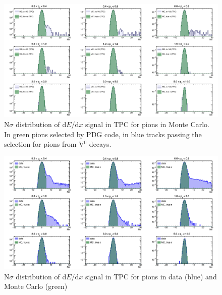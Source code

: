 \begin{figure}[!h]
 \centering
 \includegraphics[angle=0, width=15cm]{./FigCap5/PionTPC_MC.png}
 \caption{N$\sigma$ distribution of d$E$/d$x$ signal in TPC for pions in Monte Carlo. In green pions selected by PDG code, in blue tracks passing the selection for pions from V$^0$ decays.}
 \label{fig:MCPionsTPC} 
\end{figure}

\begin{figure}[!h]
 \centering
 \includegraphics[angle=0, width=15cm]{./FigCap5/PionTPC_DataMC.png}
 \caption{N$\sigma$ distribution of d$E$/d$x$ signal in TPC for pions in data (blue) and Monte Carlo (green)}
 \label{fig:DataPionsTPC} 
\end{figure}

